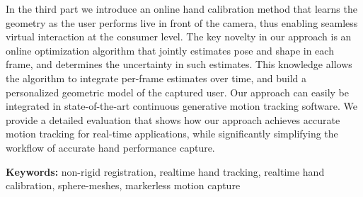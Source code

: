 In the third part we introduce an online hand calibration method that learns the geometry as the user performs live in front of the camera, thus enabling seamless virtual interaction at the consumer level. The key novelty in our approach is an online optimization algorithm that jointly estimates pose and shape in each frame, and determines the uncertainty in such estimates. This knowledge allows the algorithm to integrate per-frame estimates over time, and build a personalized geometric model of the captured user. Our approach can easily be integrated in state-of-the-art continuous generative motion tracking software. We provide a detailed evaluation that shows how our approach achieves accurate motion tracking for real-time applications, while significantly simplifying the workflow of accurate hand performance capture.

\textbf{Keywords:} non-rigid registration, realtime hand tracking, realtime hand calibration, sphere-meshes, markerless motion capture

